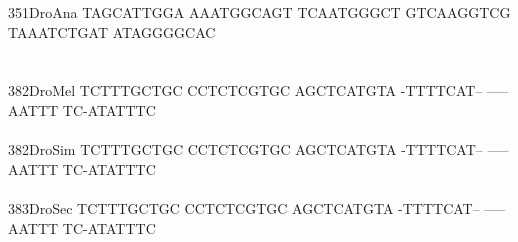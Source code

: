 \documentclass[11pt,twoside,reqno,a4paper]{article}
\begin{document}
{351\hspace*{1\charwidth}DroAna	TAGCATTGGA	AAATGGCAGT	TCAATGGGCT	GTCAAGGTCG	TAAATCTGAT	ATAGGGGCAC	\\
\hspace*{4\charwidth}\hspace*{7\charwidth}\hspace*{1\charwidth}\hspace*{1\charwidth}\hspace*{1\charwidth}\hspace*{1\charwidth}\hspace*{1\charwidth}\hspace*{1\charwidth}\\
\\
382\hspace*{1\charwidth}DroMel	TCTTTGCTGC	CCTCTCGTGC	AGCTCATGTA	-TTTTCAT--	-----AATTT	TC-ATATTTC	\\
\hspace*{4\charwidth}\hspace*{7\charwidth}\hspace*{1\charwidth}\hspace*{1\charwidth}\hspace*{1\charwidth}\hspace*{1\charwidth}\hspace*{1\charwidth}\hspace*{1\charwidth}\\
382\hspace*{1\charwidth}DroSim	TCTTTGCTGC	CCTCTCGTGC	AGCTCATGTA	-TTTTCAT--	-----AATTT	TC-ATATTTC	\\
\hspace*{4\charwidth}\hspace*{7\charwidth}\hspace*{1\charwidth}\hspace*{1\charwidth}\hspace*{1\charwidth}\hspace*{1\charwidth}\hspace*{1\charwidth}\hspace*{1\charwidth}\\
383\hspace*{1\charwidth}DroSec	TCTTTGCTGC	CCTCTCGTGC	AGCTCATGTA	-TTTTCAT--	-----AATTT	TC-ATATTTC	\\
\hspace*{4\charwidth}\hspace*{7\charwidth}\hspace*{1\charwidth}\hspace*{1\charwidth}\hspace*{1\charwidth}\hspace*{1\charwidth}\hspace*{1\charwidth}\hspace*{1\charwidth}\\
}
\end{document}

